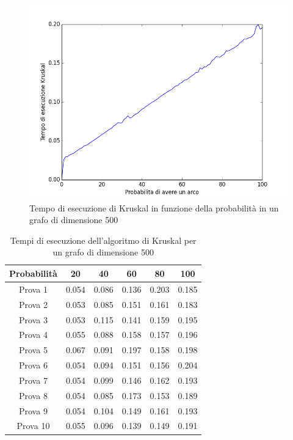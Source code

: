 \documentclass[11pt]{article}
\begin{document}
\newpage
\begin{figure}[h]
\centering
\includegraphics[scale=0.33,angle=0]{kruskal500.png}
\caption{Tempo di esecuzione di Kruskal in funzione della probabilità in un grafo di dimensione 500}
\label{k500}
\end{figure}
\begin{table}[h]
\centering
\begin{tabular}{|c|c|c|c|c|c|}\hline
Probabilità &20 &40 &60 &80 &100\\ \hline
Prova 1	&0.054	&0.086	&0.136	&0.203	&0.185 \\ \hline
Prova 2	&0.053	&0.085	&0.151	&0.161	&0.183 \\ \hline
Prova 3	&0.053	&0.115	 &0.141  &0.159	&0.195 \\ \hline
Prova 4	&0.055	&0.088	&0.158	&0.157	&0.196 \\ \hline
Prova 5	&0.067	&0.091	&0.197	&0.158	&0.198 \\ \hline
Prova 6	&0.054	&0.094	&0.151	&0.156	&0.204  \\ \hline
Prova 7	&0.054	&0.099	&0.146	&0.162	&0.193  \\ \hline
Prova 8	&0.054	&0.085	&0.173	&0.153	&0.189  \\ \hline
Prova 9	&0.054	&0.104	&0.149	&0.161	&0.193 \\ \hline
Prova 10	&0.055	&0.096	&0.139	&0.149	&0.191 \\ \hline
\end{tabular}
\caption{Tempi di esecuzione dell'algoritmo di Kruskal per un grafo di dimensione 500}
\label{t_k500}
\end{table}
\end{document}
